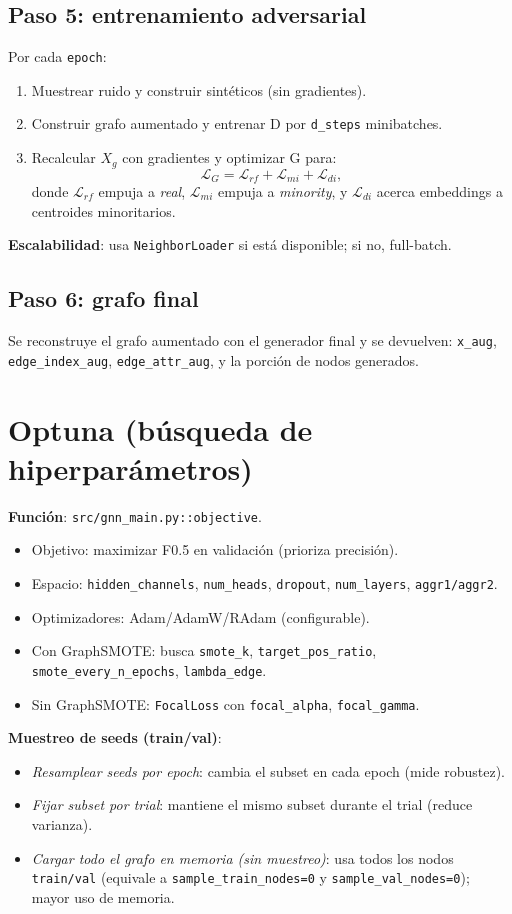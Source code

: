 \subsection{Paso 5: entrenamiento adversarial}
Por cada \texttt{epoch}:
\begin{enumerate}[leftmargin=*]
  \item Muestrear ruido y construir sint\'eticos (sin gradientes).
  \item Construir grafo aumentado y entrenar D por \texttt{d\_steps} minibatches.
  \item Recalcular $X_g$ con gradientes y optimizar G para:
  \[
  \mathcal{L}_G = \mathcal{L}_{rf} + \mathcal{L}_{mi} + \mathcal{L}_{di},
  \]
  donde $\mathcal{L}_{rf}$ empuja a \emph{real}, $\mathcal{L}_{mi}$ empuja a \emph{minority}, y $\mathcal{L}_{di}$ acerca embeddings a centroides minoritarios.
\end{enumerate}
\textbf{Escalabilidad}: usa \texttt{NeighborLoader} si est\'a disponible; si no, full-batch.

\subsection{Paso 6: grafo final}
Se reconstruye el grafo aumentado con el generador final y se devuelven:
\texttt{x\_aug}, \texttt{edge\_index\_aug}, \texttt{edge\_attr\_aug}, y la porci\'on de nodos generados.

\section{Optuna (b\'usqueda de hiperpar\'ametros)}
\label{sec:optuna}
\textbf{Funci\'on}: \texttt{src/gnn\_main.py::objective}.
\begin{itemize}[leftmargin=*]
  \item Objetivo: maximizar F0.5 en validaci\'on (prioriza precisi\'on).
  \item Espacio: \texttt{hidden\_channels}, \texttt{num\_heads}, \texttt{dropout}, \texttt{num\_layers}, \texttt{aggr1/aggr2}.
  \item Optimizadores: Adam/AdamW/RAdam (configurable).
  \item Con GraphSMOTE: busca \texttt{smote\_k}, \texttt{target\_pos\_ratio}, \texttt{smote\_every\_n\_epochs}, \texttt{lambda\_edge}.
  \item Sin GraphSMOTE: \texttt{FocalLoss} con \texttt{focal\_alpha}, \texttt{focal\_gamma}.
\end{itemize}
\textbf{Muestreo de seeds (train/val)}:
\begin{itemize}[leftmargin=*]
  \item \emph{Resamplear seeds por epoch}: cambia el subset en cada epoch (mide robustez).
  \item \emph{Fijar subset por trial}: mantiene el mismo subset durante el trial (reduce varianza).
  \item \emph{Cargar todo el grafo en memoria (sin muestreo)}: usa todos los nodos \texttt{train/val} (equivale a \texttt{sample\_train\_nodes=0} y \texttt{sample\_val\_nodes=0}); mayor uso de memoria.
\end{itemize}

